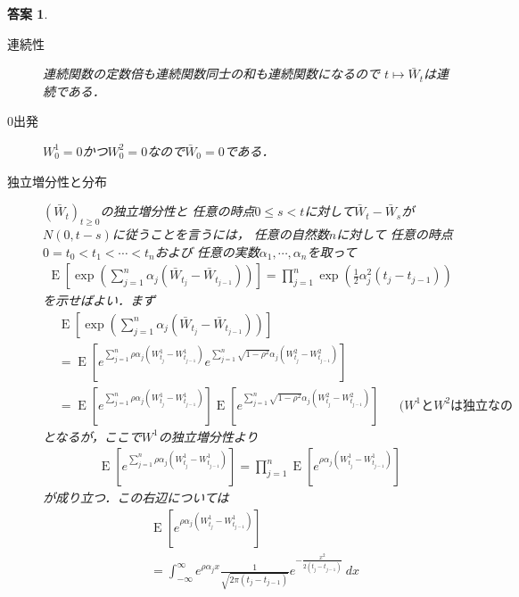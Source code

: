 \documentclass[11pt,a4paper]{jsarticle}
\theoremstyle{mystyle}
\newtheorem*{ans}{答案}
\begin{document}
\begin{ans}\mbox{}
	\begin{description}
		\item[連続性]
			連続関数の定数倍も連続関数同士の和も連続関数になるので
			$t \longmapsto \bar{W}_{t}$は連続である．
			
		\item[$0$出発]
			$W^{1}_{0} = 0$かつ$W^{2}_{0} = 0$なので$\bar{W}_{0} = 0$である．
			
		\item[独立増分性と分布]
			$(\bar{W}_{t})_{t \geq 0}$の独立増分性と
			任意の時点$0 \leq s < t$に対して$\bar{W}_{t} - \bar{W}_{s}$が
			$N(0,t-s)$に従うことを言うには，
			任意の自然数$n$に対して
			任意の時点$0 = t_{0} < t_{1} < \cdots < t_{n}$および
			任意の実数$\alpha_{1},\cdots,\alpha_{n}$を取って
			\begin{align}
				\operatorname{E}\left[\exp{\left(\sum_{j=1}^{n}\alpha_{j}(\bar{W}_{t_{j}} - \bar{W}_{t_{j-1}})\right)}\right]
				= \prod_{j=1}^{n} \exp{\left(\frac{1}{2}\alpha_{j}^{2}(t_{j}-t_{j-1})\right)}
			\end{align}
			を示せばよい．まず
			\begin{align}
				&\operatorname{E}\left[\exp{\left(\sum_{j=1}^{n}\alpha_{j}(\bar{W}_{t_{j}} - \bar{W}_{t_{j-1}})\right)}\right] \\
				&= \operatorname{E}\left[e^{\sum_{j=1}^{n}\rho\alpha_{j}(W^{1}_{t_{j}} - W^{1}_{t_{j-1}})}e^{\sum_{j=1}^{n}\sqrt{1-\rho^{2}}\alpha_{j}(W^{2}_{t_{j}} - W^{2}_{t_{j-1}})}\right] \\
				&=  \operatorname{E}\left[e^{\sum_{j=1}^{n}\rho\alpha_{j}(W^{1}_{t_{j}} - W^{1}_{t_{j-1}})}\right] \operatorname{E}\left[e^{\sum_{j=1}^{n}\sqrt{1-\rho^{2}}\alpha_{j}(W^{2}_{t_{j}} - W^{2}_{t_{j-1}})}\right] && \mbox{($W^{1}$と$W^{2}$は独立なので)}
			\end{align}
			となるが，ここで$W^{1}$の独立増分性より
			\begin{align}
				\operatorname{E}\left[e^{\sum_{j=1}^{n}\rho\alpha_{j}(W^{1}_{t_{j}} - W^{1}_{t_{j-1}})}\right] 
				= \prod_{j=1}^{n} \operatorname{E}\left[e^{\rho\alpha_{j}(W^{1}_{t_{j}} - W^{1}_{t_{j-1}})}\right]
			\end{align}
			が成り立つ．この右辺については
			\begin{align}
				&\operatorname{E}\left[e^{\rho\alpha_{j}(W^{1}_{t_{j}} - W^{1}_{t_{j-1}})}\right] \\
				&= \int_{-\infty}^{\infty} e^{\rho\alpha_{j}x}\frac{1}{\sqrt{2\pi(t_{j}-t_{j-1})}}e^{-\frac{x^{2}}{2(t_{j}-t_{j-1})}}\ dx \\

\end{align}
\end{description}
\end{ans}
\end{document}
